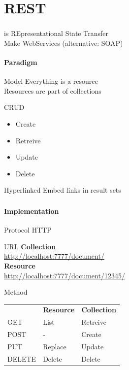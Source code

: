 \documentclass[handout]{beamer}
\begin{document}
\section{REST}
\begin{frame}
	\frametitle{\insertsection}
	\begin{block}{is}
		REpresentational State Transfer\\
		Make WebServices (alternative: SOAP)
	\end{block}
	\framesubtitle{Paradigm}
	\begin{block}{Model}
		Everything is a resource \\
		Resources are part of collections
	\end{block}
	\begin{block}{CRUD}
		\begin{itemize}
			\item Create
			\item Retreive
			\item Update
			\item Delete
		\end{itemize}
	\end{block}
	\begin{block}{Hyperlinked}
		Embed links in result sets
	\end{block}
\end{frame}

\begin{frame}
	\frametitle{\insertsection}
	\framesubtitle{Implementation}
	\begin{block}{Protocol}
		HTTP
	\end{block}
	\begin{block}{URL}
		\textbf{Collection} \\
		\url{http://localhost:7777/document/} \\
		\textbf{Resource} \\
		\url{http://localhost:7777/document/12345/}
	\end{block}
	\begin{block}{Method}
		\begin{tabular}{lll}
			& \textbf{Resource} & \textbf{Collection} \\
			GET & List & Retreive \\
			POST & - & Create \\
			PUT & Replace & Update \\
			DELETE & Delete & Delete \\
		\end{tabular}
	\end{block}
\end{frame}
\end{document}
